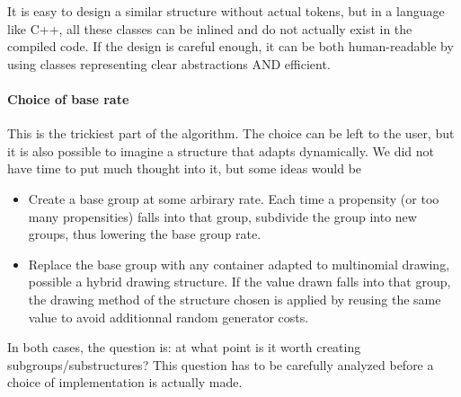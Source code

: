 It is easy to design a similar structure without actual tokens, but in a language like C++, all these classes can be inlined and do not actually exist in the compiled code. If the design is careful enough, it can be both human-readable by using classes representing clear abstractions AND efficient.

\paragraph{Choice of base rate}

This is the trickiest part of the algorithm. The choice can be left to the user, but it is also possible to imagine a structure that adapts dynamically. We did not have time to put much thought into it, but some ideas would be
\begin{itemize}
  \item Create a base group at some arbirary rate. Each time a propensity (or too many propensities) falls into that group, subdivide the group into new groups, thus lowering the base group rate.
  \item Replace the base group with any container adapted to multinomial drawing, possible a hybrid drawing structure. If the value drawn falls into that group, the drawing method of the structure chosen is applied by reusing the same value to avoid additionnal random generator costs.
\end{itemize}

In both cases, the question is: at what point is it worth creating subgroups/substructures? This question has to be carefully analyzed before a choice of implementation is actually made.
